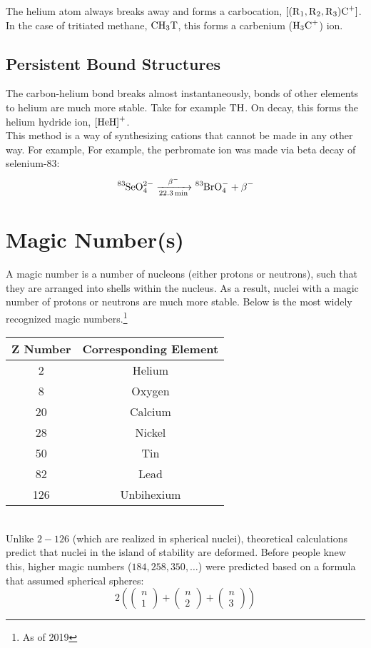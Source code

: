 \documentclass{article}
\begin{document}
\begin{multicols*}{2}
    The helium atom always breaks away and forms a carbocation, $\ce{[(R1,R2,R3)C+]}$.
    In the case of tritiated methane, $\ce{CH3T}$, this forms a carbenium ($\ce{H3C+}$) ion.

    \subsection{Persistent Bound Structures}
    The carbon-helium bond breaks almost instantaneously, bonds of other elements to helium
    are much more stable. Take for example $\ce{TH}$. On decay, this forms the
    helium hydride ion, $\ce{[HeH]+}$.\\

    This method is a way of synthesizing cations that cannot be made in any other way. For example,
    For example, the perbromate ion was made via beta decay of selenium-83:
    \[
      \ce{^{83}SeO^{2-}_{4} ->[\beta-][22.3min] ^{83}BrO^-_4 + \beta-}
    \]

    \section{Magic Number(s)}
    A magic number is a number of nucleons (either protons or neutrons), such that they
    are arranged into shells within the nucleus. As a result, nuclei with a magic number of
    protons or neutrons are much more stable. Below is the most widely recognized magic numbers.\footnote{As of 2019}
    
    \begin{tabular}{|c|c|}
      \hline
      \textbf{Z Number} & \textbf{Corresponding Element} \\
      \hline
      2   & Helium  \\
      8   & Oxygen  \\
      20  & Calcium \\
      28  & Nickel  \\
      50  & Tin     \\
      82  & Lead    \\
      126 & Unbihexium \\
      \hline
    \end{tabular}\\


    Unlike $2-126$ (which are realized in spherical nuclei), theoretical calculations
    predict that nuclei in the island of stability are deformed. Before people knew this,
    higher magic numbers ($184, 258, 350, \ldots$) were predicted based on a formula
    that assumed spherical spheres:
    \[
      2\left(\begin{pmatrix}n\\ 1\end{pmatrix} + \begin{pmatrix}n\\ 2\end{pmatrix} + \begin{pmatrix}n\\ 3\end{pmatrix}\right)
    \] 
    

\end{multicols*}
\end{document}
